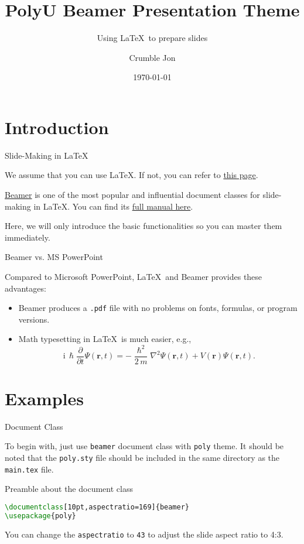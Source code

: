 \documentclass[10pt,aspectratio=169]{beamer}
\title{PolyU Beamer Presentation Theme}
\subtitle{Using \LaTeX\ to prepare slides}
\author{Crumble Jon}
\institute[COMP]{Department of Computing}
\date{\today}
\begin{document}
\maketitle %

\section{Introduction}

\begin{frame}{Slide-Making in \LaTeX}

	We assume that you can use \LaTeX. If not, you can refer to \href{https://www.overleaf.com/learn/latex/Learn_LaTeX_in_30_minutes}{this page}.

	\href{https://www.overleaf.com/learn/latex/Beamer}{Beamer} is one of the most popular and influential document classes for slide-making in \LaTeX. You can find its \href{https://mirror-hk.koddos.net/CTAN/macros/latex/contrib/beamer/doc/beameruserguide.pdf}{full manual here}.

	Here, we will only introduce the basic functionalities so you can master them immediately.
\end{frame}


\begin{frame}{Beamer vs. MS PowerPoint}

	Compared to Microsoft PowerPoint, \LaTeX\ and Beamer provides these advantages:
	
	\begin{itemize}
		\item Beamer produces a \texttt{.pdf} file with no problems on fonts, formulas, or program versions.
		\item Math typesetting in \LaTeX\ is much easier, e.g.,
			\begin{equation*}
				\mathrm{i}\,\hslash\frac{\partial}{\partial t} \Psi(\mathbf{r},t) =
				-\frac{\hslash^2}{2\,m}\nabla^2\Psi(\mathbf{r},t)
				+ V(\mathbf{r})\Psi(\mathbf{r},t).
			\end{equation*}
	\end{itemize}
\end{frame}

\section{Examples}

\begin{frame}[fragile]{Document Class}

	To begin with, just use \texttt{beamer} document class with \texttt{poly} theme. It should be noted that the \texttt{poly.sty} file should be included in the same directory as the \texttt{main.tex} file.
	
\begin{block}{Preamble about the document class}
\begin{lstlisting}[language=TeX]
\documentclass[10pt,aspectratio=169]{beamer}
\usepackage{poly}
\end{lstlisting}
\end{block}
	
	You can change the \texttt{aspectratio} to \texttt{43} to adjust the slide aspect ratio to 4:3.
\end{frame}
\end{document}

